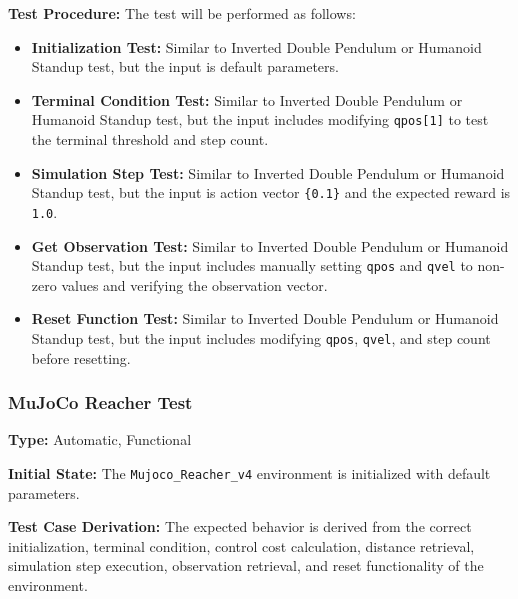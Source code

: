 \documentclass[12pt, titlepage]{article}
\begin{document}
\textbf{Test Procedure:} The test will be performed as follows:
\begin{itemize}
    \item \textbf{Initialization Test:} Similar to Inverted Double Pendulum or Humanoid Standup test, but the input is default parameters.
    
    \item \textbf{Terminal Condition Test:} Similar to Inverted Double Pendulum or Humanoid Standup test, but the input includes modifying \texttt{qpos[1]} to test the terminal threshold and step count.
    
    \item \textbf{Simulation Step Test:} Similar to Inverted Double Pendulum or Humanoid Standup test, but the input is action vector \texttt{\{0.1\}} and the expected reward is \texttt{1.0}.
    
    \item \textbf{Get Observation Test:} Similar to Inverted Double Pendulum or Humanoid Standup test, but the input includes manually setting \texttt{qpos} and \texttt{qvel} to non-zero values and verifying the observation vector.
    
    \item \textbf{Reset Function Test:} Similar to Inverted Double Pendulum or Humanoid Standup test, but the input includes modifying \texttt{qpos}, \texttt{qvel}, and step count before resetting.
\end{itemize}


\subsubsection{MuJoCo Reacher Test}

\textbf{Type:} Automatic, Functional

\textbf{Initial State:} The \texttt{Mujoco\_Reacher\_v4} environment is initialized with default parameters.

\textbf{Test Case Derivation:} The expected behavior is derived from the correct initialization, terminal condition, control cost calculation, distance retrieval, simulation step execution, observation retrieval, and reset functionality of the environment.
\end{document}
